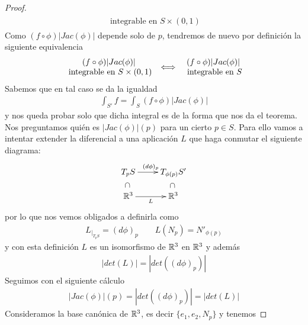 \begin{teo}
\begin{proof}
\begin{gather*}
\begin{array}{c}
                \text{ integrable en $S\times(0,1)$}
            \end{array}
        \end{gather*}
        Como $(f\circ \phi)|Jac(\phi)|$ depende solo de $p$, tendremos de nuevo por definición la siguiente equivalencia
        \begin{gather*}
            \begin{array}{c}
                (f\circ \phi)|Jac(\phi)| \\
                \text{ integrable en $S\times(0,1)$}
            \end{array}
            \iff 
            \begin{array}{c}
                (f\circ \phi)|Jac(\phi)| \\
                \text{ integrable en $S$}
            \end{array}
        \end{gather*}
        Sabemos que en tal caso se da la igualdad
        \begin{gather*}
            \int_{S'}f = \int_S (f\circ \phi) |Jac(\phi)|
        \end{gather*}
        y nos queda probar solo que dicha integral es de la forma que nos da el teorema. Nos preguntamos quién es $|Jac(\phi)|(p)$ para un cierto $p\in S$. Para ello vamos a intentar extender la diferencial a una aplicación $L$ que haga conmutar el siguiente diagrama:
        \begin{gather*}
            \xymatrix@R=5mm{
                T_pS \ar[r]^{(d\phi)_p} \ar@{}[d]|-*[@]{\subset} & T_{\phi(p)}S' \ar@{}[d]|-*[@]{\subset}\\
                \bb{R}^3 \ar[r]_L & \bb{R}^3
            }
        \end{gather*}
        por lo que nos vemos obligados a definirla como 
        \begin{gather*}
            L_{|_{T_pS}} = (d\phi)_p \qquad L(N_p) = N'_{\phi(p)}
        \end{gather*}
        y con esta definición $L$ es un isomorfismo de $\mathbb{R}^3$ en $\mathbb{R}^3$ y además
        \begin{gather*}
            |det(L)| = |det((d\phi)_p)|
        \end{gather*}
        Seguimos con el siguiente cálculo
        \begin{gather*}
            |Jac(\phi)|(p) = |det((d\phi)_p)| = |det(L)|
        \end{gather*}
        Consideramos la base canónica de $\mathbb{R}^3$, es decir $\{e_1, e_2, N_p\}$ y tenemos 

\end{proof}
\end{teo}

